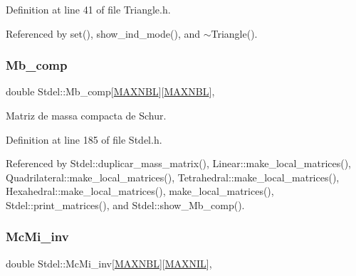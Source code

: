 Definition at line 41 of file Triangle.\+h.



Referenced by set(), show\+\_\+ind\+\_\+mode(), and $\sim$\+Triangle().

\mbox{\label{classStdel_aa1627cb39fa5da75764809412159c825}} 
\subsubsection{\texorpdfstring{Mb\+\_\+comp}{Mb\_comp}}
{\footnotesize\ttfamily double Stdel\+::\+Mb\+\_\+comp\mbox{[}\hyperlink{MyOptions_8h_aed8828a63ec0a2a0461b7c9ed39dd648}{M\+A\+X\+N\+BL}\mbox{]}\mbox{[}\hyperlink{MyOptions_8h_aed8828a63ec0a2a0461b7c9ed39dd648}{M\+A\+X\+N\+BL}\mbox{]}\hspace{0.3cm}{\ttfamily [protected]}, {\ttfamily [inherited]}}



Matriz de massa compacta de Schur. 



Definition at line 185 of file Stdel.\+h.



Referenced by Stdel\+::duplicar\+\_\+mass\+\_\+matrix(), Linear\+::make\+\_\+local\+\_\+matrices(), Quadrilateral\+::make\+\_\+local\+\_\+matrices(), Tetrahedral\+::make\+\_\+local\+\_\+matrices(), Hexahedral\+::make\+\_\+local\+\_\+matrices(), make\+\_\+local\+\_\+matrices(), Stdel\+::print\+\_\+matrices(), and Stdel\+::show\+\_\+\+Mb\+\_\+comp().

\mbox{\label{classStdel_acc685141e80bcce9703e37f32cc5c42c}} 
\subsubsection{\texorpdfstring{Mc\+Mi\+\_\+inv}{McMi\_inv}}
{\footnotesize\ttfamily double Stdel\+::\+Mc\+Mi\+\_\+inv\mbox{[}\hyperlink{MyOptions_8h_aed8828a63ec0a2a0461b7c9ed39dd648}{M\+A\+X\+N\+BL}\mbox{]}\mbox{[}\hyperlink{MyOptions_8h_a463cdf068fb6289d1f81dac7e0f76ab5}{M\+A\+X\+N\+IL}\mbox{]}\hspace{0.3cm}{\ttfamily [protected]}, {\ttfamily [inherited]}}



